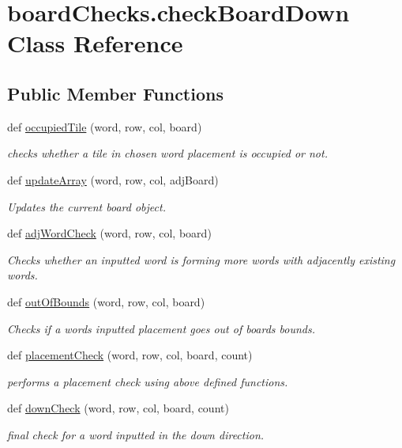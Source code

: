 \hypertarget{classboard_checks_1_1check_board_down}{}\section{board\+Checks.\+check\+Board\+Down Class Reference}
\label{classboard_checks_1_1check_board_down}
\subsection*{Public Member Functions}
\begin{DoxyCompactItemize}
\item 
def \hyperlink{classboard_checks_1_1check_board_down_a8359646cbfe4164fbb3dc7e62d1ce8a2}{occupied\+Tile} (word, row, col, board)
\begin{DoxyCompactList}\small\item\em checks whether a tile in chosen word placement is occupied or not. \end{DoxyCompactList}\item 
def \hyperlink{classboard_checks_1_1check_board_down_a1912bf117f666274ccb2e2fcd6e150d8}{update\+Array} (word, row, col, adj\+Board)
\begin{DoxyCompactList}\small\item\em Updates the current board object. \end{DoxyCompactList}\item 
def \hyperlink{classboard_checks_1_1check_board_down_a20d1c2afa3247e7889357f2a492a5e28}{adj\+Word\+Check} (word, row, col, board)
\begin{DoxyCompactList}\small\item\em Checks whether an inputted word is forming more words with adjacently existing words. \end{DoxyCompactList}\item 
def \hyperlink{classboard_checks_1_1check_board_down_a8e340fd1c90c5ba81d0d37c3a3627f93}{out\+Of\+Bounds} (word, row, col, board)
\begin{DoxyCompactList}\small\item\em Checks if a words inputted placement goes out of boards bounds. \end{DoxyCompactList}\item 
def \hyperlink{classboard_checks_1_1check_board_down_a9d61814308608ce9252dfc9c5f970c20}{placement\+Check} (word, row, col, board, count)
\begin{DoxyCompactList}\small\item\em performs a placement check using above defined functions. \end{DoxyCompactList}\item 
def \hyperlink{classboard_checks_1_1check_board_down_a413bed8316b61ab829d954398bc884e8}{down\+Check} (word, row, col, board, count)
\begin{DoxyCompactList}\small\item\em final check for a word inputted in the down direction. \end{DoxyCompactList}\end{DoxyCompactItemize}


